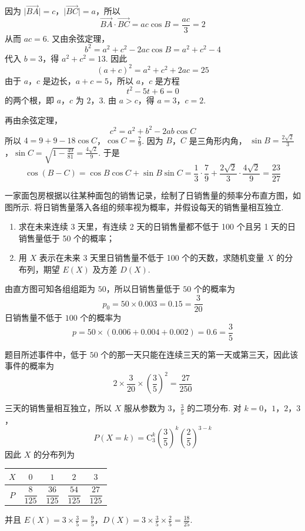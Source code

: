 \begin{solution}
因为 \(\lvert\overrightarrow{BA}\rvert=c\)，\(\lvert\overrightarrow{BC}\rvert=a\)，所以
\[
\overrightarrow{BA}\cdot\overrightarrow{BC}=ac\cos B=\frac{ac}{3}=2
\]
从而 \(ac=6\). 又由余弦定理，
\[
b^2=a^2+c^2-2ac\cos B=a^2+c^2-4
\]
代入 \(b=3\)，得 \(a^2+c^2=13\). 因此
\[
(a+c)^2=a^2+c^2+2ac=25
\]
由于 \(a\)，\(c\) 是边长，\(a+c=5\)，所以 \(a\)，\(c\) 是方程
\[
t^2-5t+6=0
\]
的两个根，即 \(a\)，\(c\) 为 \(2\)，\(3\). 由 \(a>c\)，得
\(a=3\)，\(c=2\).

再由余弦定理，
\[
c^2=a^2+b^2-2ab\cos C
\]
所以
\(4=9+9-18\cos C\)，\(\cos C=\frac79\).
因为 \(B\)，\(C\) 是三角形内角，
\(\sin B=\frac{2\sqrt2}{3}\)，\(\sin C=\sqrt{1-\frac{49}{81}}=\frac{4\sqrt2}{9}\).
于是
\[
\cos(B-C)=\cos B\cos C+\sin B\sin C
=\frac13\cdot\frac79+\frac{2\sqrt2}{3}\cdot\frac{4\sqrt2}{9}
=\frac{23}{27}
\]
\end{solution}

\begin{problem}
一家面包房根据以往某种面包的销售记录，绘制了日销售量的频率分布直方图，如图所示. 将日销售量落入各组的频率视为概率，并假设每天的销售量相互独立.

\begin{enumerate}
\item 求在未来连续 3 天里，有连续 2 天的日销售量都不低于 100 个且另 1 天的日销售量低于 50 个的概率；
\item 用 \(X\) 表示在未来 3 天里日销售量不低于 100 个的天数，求随机变量 \(X\) 的分布列，期望 \(E(X)\) 及方差 \(D(X)\).
\end{enumerate}

\end{problem}

\begin{solution}
由直方图可知各组组距为 \(50\)，所以日销售量低于 \(50\) 个的概率为
\[
p_0=50\times0.003=0.15=\frac3{20}
\]
日销售量不低于 \(100\) 个的概率为
\[
p=50\times(0.006+0.004+0.002)=0.6=\frac35
\]

题目所述事件中，低于 \(50\) 个的那一天只能在连续三天的第一天或第三天，因此该事件的概率为
\[
2\times\frac3{20}\times\left(\frac35\right)^2
=\frac{27}{250}
\]

三天的销售量相互独立，所以 \(X\) 服从参数为 \(3\)，\(\frac35\) 的二项分布. 对 \(k=0\)，\(1\)，\(2\)，\(3\)，
\[
P(X=k)=\mathrm C_3^k\left(\frac35\right)^k\left(\frac25\right)^{3-k}
\]
因此 \(X\) 的分布列为
\begin{center}
\begin{tabular}{c|cccc}
\(X\) & \(0\) & \(1\) & \(2\) & \(3\) \\
\hline
\(P\) & \(\dfrac8{125}\) & \(\dfrac{36}{125}\) & \(\dfrac{54}{125}\) & \(\dfrac{27}{125}\)
\end{tabular}
\end{center}
并且
\(E(X)=3\times\frac35=\frac95\)，\(D(X)=3\times\frac35\times\frac25=\frac{18}{25}\).
\end{solution}

